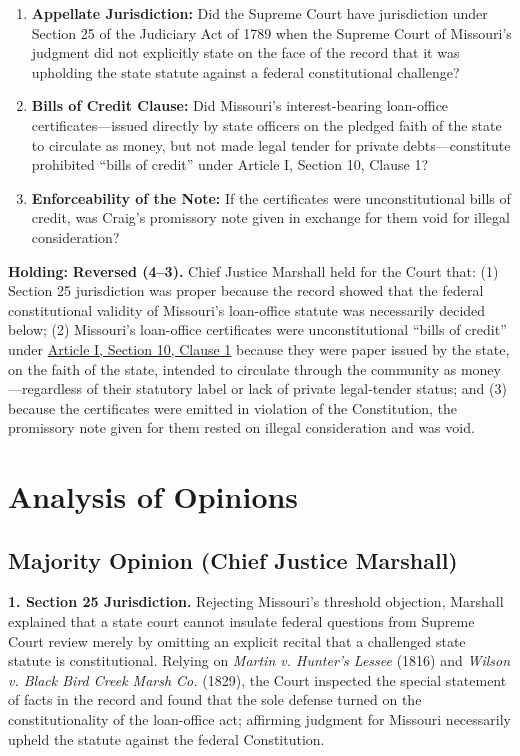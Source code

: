 \documentclass[12pt]{article}
\begin{document}
\begin{enumerate}
  \item \textbf{Appellate Jurisdiction:} Did the Supreme Court have jurisdiction under Section 25 of the Judiciary Act of 1789 when the Supreme Court of Missouri's judgment did not explicitly state on the face of the record that it was upholding the state statute against a federal constitutional challenge?
  \item \textbf{Bills of Credit Clause:} Did Missouri's interest-bearing loan-office certificates---issued directly by state officers on the pledged faith of the state to circulate as money, but not made legal tender for private debts---constitute prohibited ``bills of credit'' under Article I, Section 10, Clause 1?
  \item \textbf{Enforceability of the Note:} If the certificates were unconstitutional bills of credit, was Craig's promissory note given in exchange for them void for illegal consideration?
\end{enumerate}

\textbf{Holding:} \textbf{Reversed (4--3).} Chief Justice Marshall held for the Court that: (1) Section 25 jurisdiction was proper because the record showed that the federal constitutional validity of Missouri's loan-office statute was necessarily decided below; (2) Missouri's loan-office certificates were unconstitutional ``bills of credit'' under \href{https://www.law.cornell.edu/constitution-conan/article-1/section-1/clause-1/coining-money-by-states}{Article I, Section 10, Clause 1} because they were paper issued by the state, on the faith of the state, intended to circulate through the community as money---regardless of their statutory label or lack of private legal-tender status; and (3) because the certificates were emitted in violation of the Constitution, the promissory note given for them rested on illegal consideration and was void.

\section{Analysis of Opinions}
\subsection{Majority Opinion (Chief Justice Marshall)}

\textbf{1. Section 25 Jurisdiction.} Rejecting Missouri's threshold objection, Marshall explained that a state court cannot insulate federal questions from Supreme Court review merely by omitting an explicit recital that a challenged state statute is constitutional. Relying on \textit{Martin v. Hunter's Lessee} (1816) and \textit{Wilson v. Black Bird Creek Marsh Co.} (1829), the Court inspected the special statement of facts in the record and found that the sole defense turned on the constitutionality of the loan-office act; affirming judgment for Missouri necessarily upheld the statute against the federal Constitution.
\end{document}
